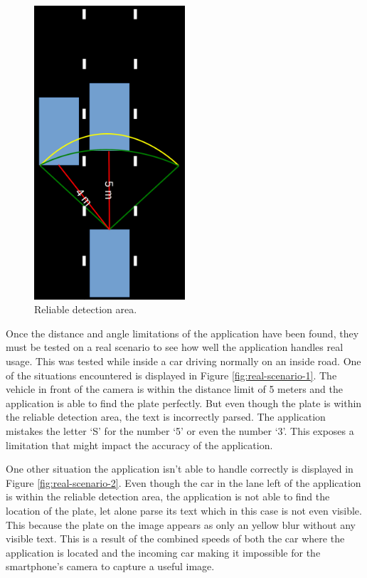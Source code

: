 \begin{figure}[ht]
    \centering
    \includegraphics[width=0.5\textwidth]{plaatjes/roadeye-road}
    \caption{Reliable detection area.}
    \label{fig:road-situation}
\end{figure}%

\clearpage


Once the distance and angle limitations of the application have been found, they must be tested on a real scenario to see how well the application handles real usage. This was tested while inside a car driving normally on an inside road. One of the situations encountered is displayed in Figure \ref{fig:real-scenario-1}. The vehicle in front of the camera is within the distance limit of 5 meters and the application is able to find the plate perfectly. But even though the plate is within the reliable detection area, the text is incorrectly parsed. The application mistakes the letter `S' for the number `5' or even the number `3'. This exposes a limitation that might impact the accuracy of the application. 

One other situation the application isn't able to handle correctly is displayed in Figure \ref{fig:real-scenario-2}. Even though the car in the lane left of the application is within the reliable detection area, the application is not able to find the location of the plate, let alone parse its text which in this case is not even visible. This because the plate on the image appears as only an yellow blur without any visible text. This is a result of the combined speeds of both the car where the application is located and the incoming car making it impossible for the smartphone's camera to capture a useful image.

